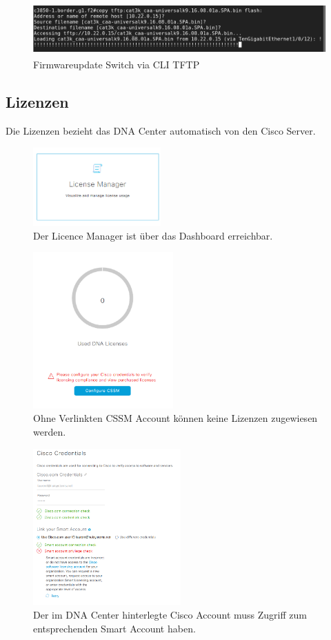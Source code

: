 \begin{figure}[H]
	\centering
	\includegraphics[height=2cm]{img/updates/Selection_111.png}
	\caption{Firmwareupdate Switch via CLI TFTP}
	\label{fig:dna-center-provision-updates-4}
\end{figure}

\subsection{Lizenzen}
Die Lizenzen bezieht das DNA Center automatisch von den Cisco Server. 
\begin{figure}[H]
	\centering
	\includegraphics[height=3cm]{img/LicenceManager_001.png}
	\caption{Der Licence Manager ist über das Dashboard erreichbar.}
	\label{fig:dna-center-licence-1}
\end{figure}

\begin{figure}[H]
	\centering
	\includegraphics[height=6cm]{img/Selection_006.png}
	\caption{Ohne Verlinkten CSSM Account können keine Lizenzen zugewiesen werden.}
	\label{fig:dna-center-licence-3}
\end{figure}

\begin{figure}[H]
	\centering
	\includegraphics[height=6cm]{img/Selection_008.png}
	\caption{Der im DNA Center hinterlegte Cisco Account muss Zugriff zum entsprechenden Smart Account haben.}
	\label{fig:dna-center-licence-4}
\end{figure}


